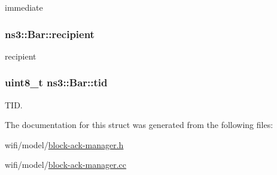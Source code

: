 immediate 

\subsubsection[{\texorpdfstring{recipient}{recipient}}]{ ns3\+::\+Bar\+::recipient}\hypertarget{structns3_1_1Bar_a7fe6fa637f1d50a84036d780a5e5869a}{}\label{structns3_1_1Bar_a7fe6fa637f1d50a84036d780a5e5869a}


recipient 

\subsubsection[{\texorpdfstring{tid}{tid}}]{\setlength{\rightskip}{0pt plus 5cm}uint8\+\_\+t ns3\+::\+Bar\+::tid}\hypertarget{structns3_1_1Bar_a85c4339ebc82a36ac4e8240d1fd8f9c8}{}\label{structns3_1_1Bar_a85c4339ebc82a36ac4e8240d1fd8f9c8}


T\+ID. 



The documentation for this struct was generated from the following files\+:\begin{DoxyCompactItemize}
\item 
wifi/model/\hyperlink{block-ack-manager_8h}{block-\/ack-\/manager.\+h}\item 
wifi/model/\hyperlink{block-ack-manager_8cc}{block-\/ack-\/manager.\+cc}\end{DoxyCompactItemize}
